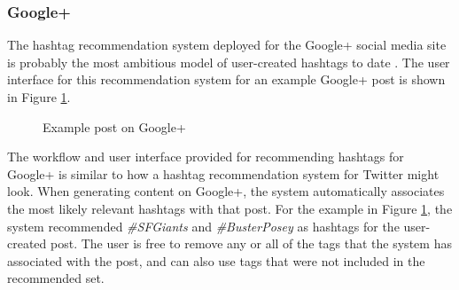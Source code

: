 \documentclass[man,floatsintext,donotrepeattitle]{apa6}
\begin{document}
\subsubsection{Google+}

The hashtag recommendation system deployed for the Google+ social media site is probably the most ambitious model of user-created hashtags to date \parencite{GoogleKeynote2013}.
The user interface for this recommendation system for an example Google+ post is shown in Figure \ref{figGoogle+Hashtags}.

\begin{figure}[!htbp]
  \caption{Example post on Google+}
  \label{figGoogle+Hashtags}
\end{figure}

The workflow and user interface provided for recommending hashtags for Google+ is similar to how a hashtag recommendation system for Twitter might look.
When generating content on Google+, the system automatically associates the most likely relevant hashtags with that post.
For the example in Figure \ref{figGoogle+Hashtags}, the system recommended \emph{\#SFGiants} and \emph{\#BusterPosey} as hashtags for the user-created post.
The user is free to remove any or all of the tags that the system has associated with the post, and can also use tags that were not included in the recommended set.
\end{document}
